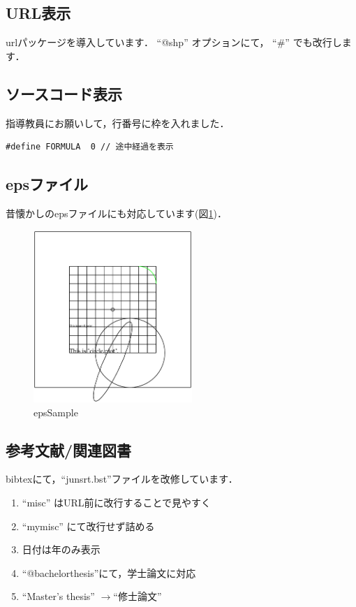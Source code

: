 \documentclass[10pt]{jarticle}
\newcommand{\zr}{$\rightarrow$}
\begin{document}
\subsection{URL表示}
urlパッケージを導入しています． ``@shp'' オプションにて， ``\#'' でも改行します．

\subsection{ソースコード表示}
指導教員にお願いして，行番号に枠を入れました．

\begin{lstlisting}[caption=FORMURAの定義]
#define FORMULA  0 // 途中経過を表示
\end{lstlisting}



\subsection{epsファイル}
昔懐かしのepsファイルにも対応しています(図\ref{fig:epsSample})．
\begin{figure}[htbp]
	\centering
	\includegraphics[width=6cm]{./fig/circle.eps}
	\caption{epsSample\cite{EPSFiles}}
	\label{fig:epsSample}
\end{figure}

\subsection{参考文献/関連図書}
bibtexにて，``junsrt.bst''ファイルを改修しています．
\begin{enumerate}
	\item ``misc'' はURL前に改行することで見やすく
	\item ``mymisc'' にて改行せず詰める
	\item 日付は年のみ表示
	\item ``@bachelorthesis''にて，学士論文に対応
	\item ``Master's thesis'' \zr ``修士論文''
\end{enumerate}
\end{document}
